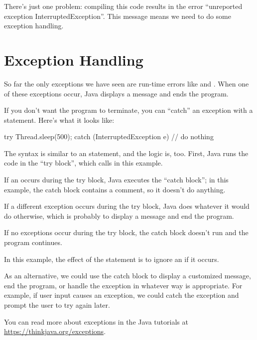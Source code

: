 
There's just one problem: compiling this code results in the error ``unreported exception InterruptedException''.
This message means we need to do some exception handling.


\section{Exception Handling}

So far the only exceptions we have seen are run-time errors like  and .
When one of these exceptions occur, Java displays a message and ends the program.

If you don't want the program to terminate, you can ``catch'' an exception with a  statement.  Here's what it looks like:


\begin{code}
    try {
        Thread.sleep(500);
    } catch (InterruptedException e) {
        // do nothing
    }
\end{code}

The syntax is similar to an  statement, and the logic is, too.
First, Java runs the code in the ``try block'', which calls  in this example.

If an  occurs during the try block, Java executes the ``catch block''; in this example, the catch block contains a comment, so it doesn't do anything.

If a different exception occurs during the try block, Java does whatever it would do otherwise, which is probably to display a message and end the program.

If no exceptions occur during the try block, the catch block doesn't run and the program continues.

In this example, the effect of the  statement is to ignore an  if it occurs.

As an alternative, we could use the catch block to display a customized message, end the program, or handle the exception in whatever way is appropriate.
For example, if user input causes an exception, we could catch the exception and prompt the user to try again later.

You can read more about exceptions in the Java tutorials at \url{https://thinkjava.org/exceptions}.


